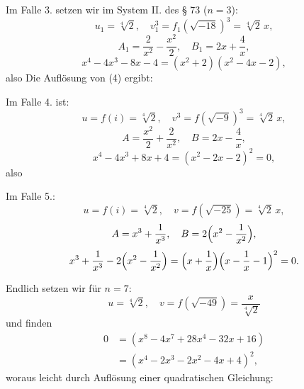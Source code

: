 Im Falle 3. setzen wir im System II. des § 73 ($n=3$):
\[
u_1=\sqrt[4]{2},\quad v_1^3=f_1(\sqrt{-18})^3=\sqrt[4]{2}\,x,
\]
\[
A_1=\frac{2}{x^2}-\frac{x^2}{2},\quad B_1=2x+\frac{4}{x},
\]
\[
x^4-4x^3-8x-4=(x^2+2)(x^2-4x-2),
\]
also
Die Auflösung von (4) ergibt:

Im Falle 4. ist:
\[
u=f(i)=\sqrt[4]{2},\quad v^3=f(\sqrt{-9})^3=\sqrt[4]{2}\,x,
\]
\[
A=\frac{x^2}{2}+\frac{2}{x^2},\quad B=2x-\frac{4}{x},
\]
\[
x^4-4x^3+8x+4=(x^2-2x-2)^2=0,
\]
also

Im Falle 5.:
\[
u=f(i)=\sqrt[4]{2},\quad v=f(\sqrt{-25})=\sqrt[4]{2}\,x,
\]
\[
A=x^3+\frac{1}{x^3},\quad B=2\Bigl(x^2-\frac{1}{x^2}\Bigr),
\]
\[
x^3+\frac{1}{x^3}-2\Bigl(x^2-\frac{1}{x^2}\Bigr)=\Bigl(x+\frac{1}{x}\Bigr)\Bigl(x-\frac{1}{x}-1\Bigr)^2=0.
\]

Endlich setzen wir für $n=7$:
\[
u=\sqrt[4]{2},\quad v=f(\sqrt{-49})=\frac{x}{\sqrt[4]{2}}
\]
und finden
\[
\begin{aligned}
0 &= (x^8-4x^7+28x^4-32x+16)\\
  &= (x^4-2x^3-2x^2-4x+4)^2,
\end{aligned}
\]
woraus leicht durch Auflösung einer quadratischen Gleichung:
